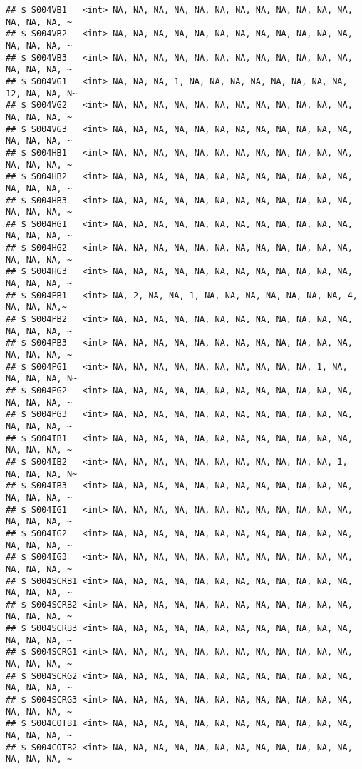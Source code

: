 \documentclass[
]{article}
\begin{document}
\begin{verbatim}
## $ S004VB1   <int> NA, NA, NA, NA, NA, NA, NA, NA, NA, NA, NA, NA, NA, NA, NA, ~
## $ S004VB2   <int> NA, NA, NA, NA, NA, NA, NA, NA, NA, NA, NA, NA, NA, NA, NA, ~
## $ S004VB3   <int> NA, NA, NA, NA, NA, NA, NA, NA, NA, NA, NA, NA, NA, NA, NA, ~
## $ S004VG1   <int> NA, NA, NA, 1, NA, NA, NA, NA, NA, NA, NA, NA, 12, NA, NA, N~
## $ S004VG2   <int> NA, NA, NA, NA, NA, NA, NA, NA, NA, NA, NA, NA, NA, NA, NA, ~
## $ S004VG3   <int> NA, NA, NA, NA, NA, NA, NA, NA, NA, NA, NA, NA, NA, NA, NA, ~
## $ S004HB1   <int> NA, NA, NA, NA, NA, NA, NA, NA, NA, NA, NA, NA, NA, NA, NA, ~
## $ S004HB2   <int> NA, NA, NA, NA, NA, NA, NA, NA, NA, NA, NA, NA, NA, NA, NA, ~
## $ S004HB3   <int> NA, NA, NA, NA, NA, NA, NA, NA, NA, NA, NA, NA, NA, NA, NA, ~
## $ S004HG1   <int> NA, NA, NA, NA, NA, NA, NA, NA, NA, NA, NA, NA, NA, NA, NA, ~
## $ S004HG2   <int> NA, NA, NA, NA, NA, NA, NA, NA, NA, NA, NA, NA, NA, NA, NA, ~
## $ S004HG3   <int> NA, NA, NA, NA, NA, NA, NA, NA, NA, NA, NA, NA, NA, NA, NA, ~
## $ S004PB1   <int> NA, 2, NA, NA, 1, NA, NA, NA, NA, NA, NA, NA, 4, NA, NA, NA,~
## $ S004PB2   <int> NA, NA, NA, NA, NA, NA, NA, NA, NA, NA, NA, NA, NA, NA, NA, ~
## $ S004PB3   <int> NA, NA, NA, NA, NA, NA, NA, NA, NA, NA, NA, NA, NA, NA, NA, ~
## $ S004PG1   <int> NA, NA, NA, NA, NA, NA, NA, NA, NA, NA, 1, NA, NA, NA, NA, N~
## $ S004PG2   <int> NA, NA, NA, NA, NA, NA, NA, NA, NA, NA, NA, NA, NA, NA, NA, ~
## $ S004PG3   <int> NA, NA, NA, NA, NA, NA, NA, NA, NA, NA, NA, NA, NA, NA, NA, ~
## $ S004IB1   <int> NA, NA, NA, NA, NA, NA, NA, NA, NA, NA, NA, NA, NA, NA, NA, ~
## $ S004IB2   <int> NA, NA, NA, NA, NA, NA, NA, NA, NA, NA, NA, 1, NA, NA, NA, N~
## $ S004IB3   <int> NA, NA, NA, NA, NA, NA, NA, NA, NA, NA, NA, NA, NA, NA, NA, ~
## $ S004IG1   <int> NA, NA, NA, NA, NA, NA, NA, NA, NA, NA, NA, NA, NA, NA, NA, ~
## $ S004IG2   <int> NA, NA, NA, NA, NA, NA, NA, NA, NA, NA, NA, NA, NA, NA, NA, ~
## $ S004IG3   <int> NA, NA, NA, NA, NA, NA, NA, NA, NA, NA, NA, NA, NA, NA, NA, ~
## $ S004SCRB1 <int> NA, NA, NA, NA, NA, NA, NA, NA, NA, NA, NA, NA, NA, NA, NA, ~
## $ S004SCRB2 <int> NA, NA, NA, NA, NA, NA, NA, NA, NA, NA, NA, NA, NA, NA, NA, ~
## $ S004SCRB3 <int> NA, NA, NA, NA, NA, NA, NA, NA, NA, NA, NA, NA, NA, NA, NA, ~
## $ S004SCRG1 <int> NA, NA, NA, NA, NA, NA, NA, NA, NA, NA, NA, NA, NA, NA, NA, ~
## $ S004SCRG2 <int> NA, NA, NA, NA, NA, NA, NA, NA, NA, NA, NA, NA, NA, NA, NA, ~
## $ S004SCRG3 <int> NA, NA, NA, NA, NA, NA, NA, NA, NA, NA, NA, NA, NA, NA, NA, ~
## $ S004COTB1 <int> NA, NA, NA, NA, NA, NA, NA, NA, NA, NA, NA, NA, NA, NA, NA, ~
## $ S004COTB2 <int> NA, NA, NA, NA, NA, NA, NA, NA, NA, NA, NA, NA, NA, NA, NA, ~

\end{verbatim}
\end{document}
